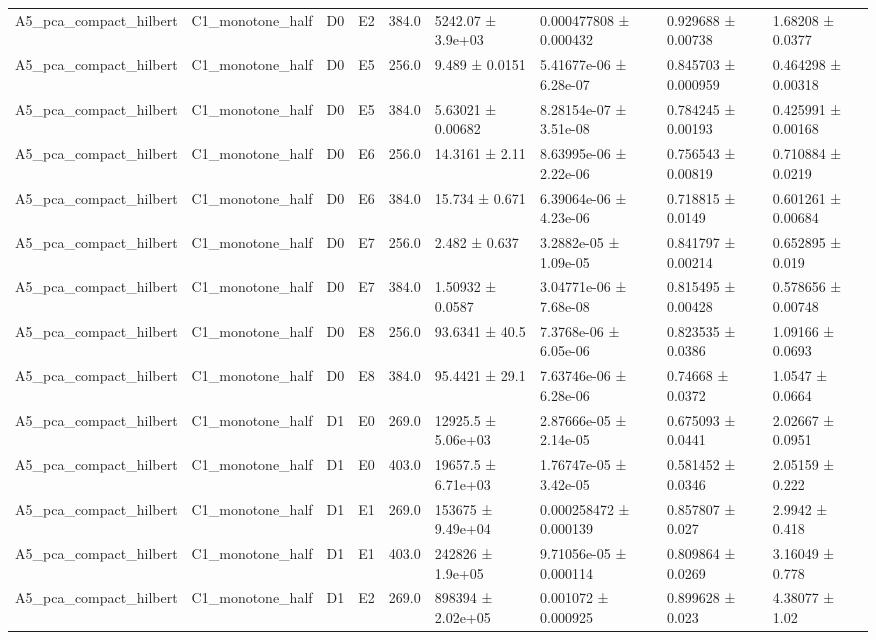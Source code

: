 \begin{table}
\begin{tabular}{lllllllll}
A5\_pca\_compact\_hilbert & C1\_monotone\_half & D0 & E2 & 384.0 & 5242.07 ± 3.9e+03 & 0.000477808 ± 0.000432 & 0.929688 ± 0.00738 & 1.68208 ± 0.0377 \\
A5\_pca\_compact\_hilbert & C1\_monotone\_half & D0 & E5 & 256.0 & 9.489 ± 0.0151 & 5.41677e-06 ± 6.28e-07 & 0.845703 ± 0.000959 & 0.464298 ± 0.00318 \\
A5\_pca\_compact\_hilbert & C1\_monotone\_half & D0 & E5 & 384.0 & 5.63021 ± 0.00682 & 8.28154e-07 ± 3.51e-08 & 0.784245 ± 0.00193 & 0.425991 ± 0.00168 \\
A5\_pca\_compact\_hilbert & C1\_monotone\_half & D0 & E6 & 256.0 & 14.3161 ± 2.11 & 8.63995e-06 ± 2.22e-06 & 0.756543 ± 0.00819 & 0.710884 ± 0.0219 \\
A5\_pca\_compact\_hilbert & C1\_monotone\_half & D0 & E6 & 384.0 & 15.734 ± 0.671 & 6.39064e-06 ± 4.23e-06 & 0.718815 ± 0.0149 & 0.601261 ± 0.00684 \\
A5\_pca\_compact\_hilbert & C1\_monotone\_half & D0 & E7 & 256.0 & 2.482 ± 0.637 & 3.2882e-05 ± 1.09e-05 & 0.841797 ± 0.00214 & 0.652895 ± 0.019 \\
A5\_pca\_compact\_hilbert & C1\_monotone\_half & D0 & E7 & 384.0 & 1.50932 ± 0.0587 & 3.04771e-06 ± 7.68e-08 & 0.815495 ± 0.00428 & 0.578656 ± 0.00748 \\
A5\_pca\_compact\_hilbert & C1\_monotone\_half & D0 & E8 & 256.0 & 93.6341 ± 40.5 & 7.3768e-06 ± 6.05e-06 & 0.823535 ± 0.0386 & 1.09166 ± 0.0693 \\
A5\_pca\_compact\_hilbert & C1\_monotone\_half & D0 & E8 & 384.0 & 95.4421 ± 29.1 & 7.63746e-06 ± 6.28e-06 & 0.74668 ± 0.0372 & 1.0547 ± 0.0664 \\
A5\_pca\_compact\_hilbert & C1\_monotone\_half & D1 & E0 & 269.0 & 12925.5 ± 5.06e+03 & 2.87666e-05 ± 2.14e-05 & 0.675093 ± 0.0441 & 2.02667 ± 0.0951 \\
A5\_pca\_compact\_hilbert & C1\_monotone\_half & D1 & E0 & 403.0 & 19657.5 ± 6.71e+03 & 1.76747e-05 ± 3.42e-05 & 0.581452 ± 0.0346 & 2.05159 ± 0.222 \\
A5\_pca\_compact\_hilbert & C1\_monotone\_half & D1 & E1 & 269.0 & 153675 ± 9.49e+04 & 0.000258472 ± 0.000139 & 0.857807 ± 0.027 & 2.9942 ± 0.418 \\
A5\_pca\_compact\_hilbert & C1\_monotone\_half & D1 & E1 & 403.0 & 242826 ± 1.9e+05 & 9.71056e-05 ± 0.000114 & 0.809864 ± 0.0269 & 3.16049 ± 0.778 \\
A5\_pca\_compact\_hilbert & C1\_monotone\_half & D1 & E2 & 269.0 & 898394 ± 2.02e+05 & 0.001072 ± 0.000925 & 0.899628 ± 0.023 & 4.38077 ± 1.02 \\

\end{tabular}
\end{table}
